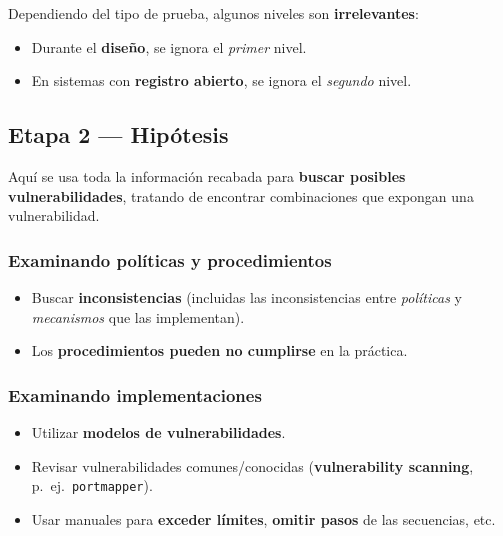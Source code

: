 \documentclass[11pt,a4paper]{article}
\newcommand{\factor}[1]{\textcolor{itbaCyanDark}{\textbf{#1}}}
\begin{document}
\begin{center}
\end{center}

Dependiendo del tipo de prueba, algunos niveles son \textbf{irrelevantes}:
\begin{itemize}[leftmargin=1.6em,itemsep=2pt]
  \item Durante el \textbf{diseño}, se ignora el \emph{primer} nivel.
  \item En sistemas con \textbf{registro abierto}, se ignora el \emph{segundo} nivel.
\end{itemize}

\subsection{Etapa 2 — Hipótesis}

Aquí se usa toda la información recabada para \textbf{buscar posibles vulnerabilidades},
tratando de encontrar combinaciones que expongan una vulnerabilidad.

\subsubsection*{Examinando políticas y procedimientos}
\begin{itemize}[leftmargin=1.6em,itemsep=2pt]
  \item Buscar \textbf{inconsistencias} (incluidas las inconsistencias entre \emph{políticas} y
        \emph{mecanismos} que las implementan).
  \item Los \textbf{procedimientos pueden no cumplirse} en la práctica.
\end{itemize}

\subsubsection*{Examinando implementaciones}
\begin{itemize}[leftmargin=1.6em,itemsep=2pt]
  \item Utilizar \textbf{modelos de vulnerabilidades}.
  \item Revisar vulnerabilidades comunes/conocidas (\factor{vulnerability scanning},
        p.\ ej.\ \texttt{portmapper}).
  \item Usar manuales para \textbf{exceder límites}, \textbf{omitir pasos} de las secuencias,
        etc.
\end{itemize}
\end{document}
